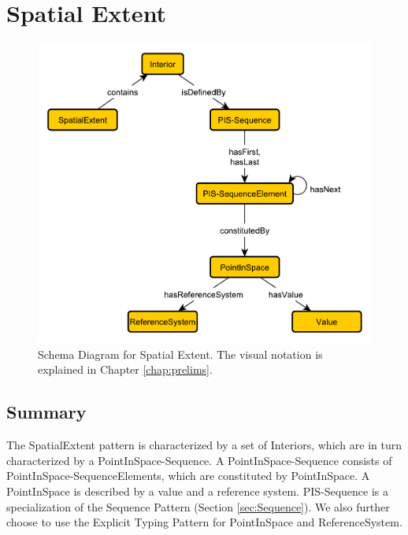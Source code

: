 \section{Spatial Extent}
\label{sec:Spatial}
\begin{figure}[h!]
\begin{center}
\includegraphics[width=.8\textwidth]{figures/spatial}
\end{center}
\caption{Schema Diagram for Spatial Extent. The visual notation is explained in Chapter \ref{chap:prelims}.}
\label{fig:Spatial}
\end{figure}
\subsection{Summary}
\label{sum:Spatial}
The \textsf{SpatialExtent} pattern is characterized by a set of \textsf{Interiors}, which are in turn characterized by a \textsf{PointInSpace-Sequence}. A \textsf{PointInSpace-Sequence} consists of \textsf{PointInSpace-SequenceElements}, which are constituted by \textsf{PointInSpace}. A \textsf{PointInSpace} is described by a value and a reference system. \textsf{PIS-Sequence} is a specialization of the \textsf{Sequence} Pattern (Section \ref{sec:Sequence}). We also further choose to use the Explicit Typing Pattern for \textsf{PointInSpace} and \textsf{ReferenceSystem}.


